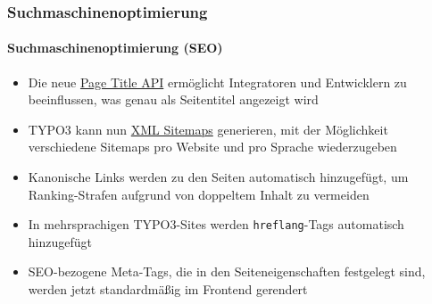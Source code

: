 \begin{frame}[fragile]
	\frametitle{Suchmaschinenoptimierung}
	\framesubtitle{Suchmaschinenoptimierung (SEO)}

	\begin{itemize}
		\item Die neue
			\href{https://docs.typo3.org/typo3cms/CoreApiReference/ApiOverview/PageTitleApi/Index.html}{Page Title API}
			ermöglicht Integratoren und Entwicklern zu beeinflussen, was genau als Seitentitel
			angezeigt wird
		\item TYPO3 kann nun
			\href{https://docs.typo3.org/typo3cms/CoreApiReference/ApiOverview/XmlSitemap/Index.html}{XML Sitemaps}
			generieren, mit der Möglichkeit verschiedene Sitemaps pro Website und pro Sprache
			wiederzugeben
		\item Kanonische Links werden zu den Seiten automatisch hinzugefügt, um 
			Ranking-Strafen aufgrund von doppeltem Inhalt zu vermeiden
		\item In mehrsprachigen TYPO3-Sites werden \texttt{hreflang}-Tags automatisch
			hinzugefügt
		\item SEO-bezogene Meta-Tags, die in den Seiteneigenschaften festgelegt sind, werden jetzt standardmäßig 
			im Frontend gerendert

	\end{itemize}

\end{frame}



